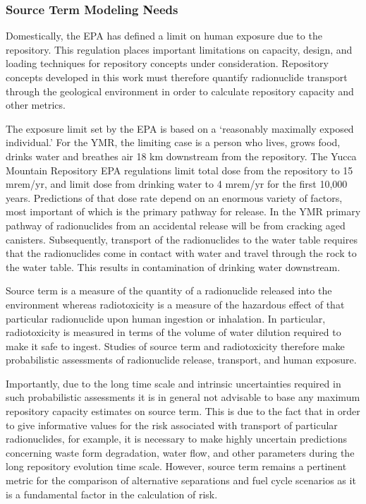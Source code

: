 \subsubsection{Source Term Modeling Needs}

Domestically, the \gls{EPA} has defined a limit on  human 
exposure due to the repository. This regulation places important limitations on 
capacity, design, and loading techniques for repository concepts under 
consideration. Repository concepts developed in this work must therefore 
quantify radionuclide transport through the geological environment in order to 
calculate repository capacity and other metrics. 

The exposure limit set by the \gls{EPA} is based on a `reasonably maximally 
exposed individual.' For the \gls{YMR}, the limiting case is a person who lives, 
grows food, drinks water and breathes air 18 km downstream from the repository. 
The Yucca Mountain Repository \gls{EPA} regulations limit total dose from the 
repository to 15 mrem/yr, and limit dose from drinking water to 4 mrem/yr for 
the first 10,000 years. 
Predictions of that dose rate depend on an enormous variety of factors, most 
important of which is the primary pathway for release. In the \gls{YMR} primary 
pathway of radionuclides from an accidental release will be from cracking aged 
canisters. Subsequently, transport of the radionuclides to the water table 
requires that the radionuclides come in contact with water and travel through 
the rock to the water table. This results in contamination of drinking water 
downstream.  

Source term is a measure of the quantity of a radionuclide released into the 
environment whereas radiotoxicity is a measure of the hazardous effect of that 
particular radionuclide upon human ingestion or inhalation.  In particular, 
radiotoxicity is measured in terms of the volume of water dilution required to 
make it safe to ingest. Studies of source term and radiotoxicity therefore make 
probabilistic assessments of radionuclide release, transport, and human 
exposure.  

Importantly, due to the long time scale and intrinsic uncertainties required in 
such probabilistic assessments it is in general not advisable to base any 
maximum repository capacity estimates on source term. This is due to the fact 
that in order to give informative values for the risk associated with transport of 
particular radionuclides, for example, it is necessary to make highly uncertain  
predictions concerning waste form degradation, water flow, and other parameters 
during the long repository evolution time scale.  However, source term remains a 
pertinent metric for the comparison of alternative separations and fuel cycle
scenarios as it is a fundamental factor in the calculation of risk.

